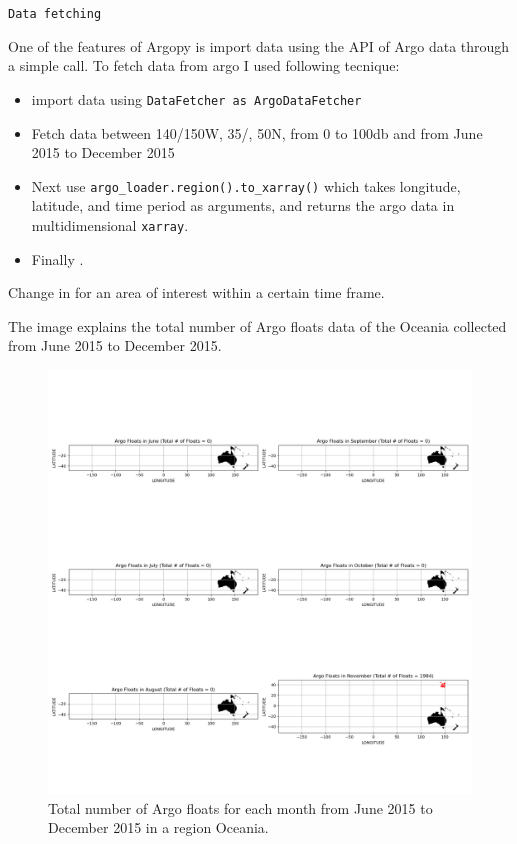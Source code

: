 \documentclass[12pt]{article}
\begin{document}
\verb|Data fetching|

One of the features of Argopy is import data using the API of Argo data through a simple call. To fetch data from argo I used following tecnique:
\begin{itemize}
     \item import data using  \verb|DataFetcher as ArgoDataFetcher|
     \item Fetch data between 140/150W, 35/, 50N, from 0 to 100db and from June 2015 to December 2015
    \item Next use \verb|argo_loader.region().to_xarray()| which takes longitude, latitude, and time period as arguments, and 
     returns the argo data in multidimensional \verb|xarray|.
     \item Finally .
\end{itemize}
Change in  for an area of interest within a certain time frame.


The image explains the total number of Argo floats data of the Oceania collected from June 2015 to December 2015.

\begin{figure}[H]
\includegraphics[width=\textwidth,height=\textheight,keepaspectratio]{monthly.png}
\caption{Total number of Argo floats for each month from June 2015 to December 2015  in a region Oceania.}
\label{fig:task 1}
 
\end{figure}
\end{document}
